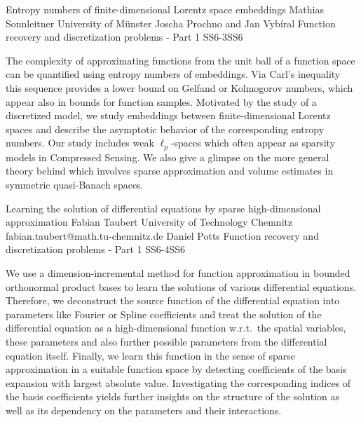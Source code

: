 \begin{talk}
  {Entropy numbers of finite-dimensional Lorentz space embeddings}%
  {Mathias Sonnleitner}%
  {University of M\"unster}%
  {}%
  {Joscha Prochno and Jan Vyb\'iral}%
{Function recovery and discretization problems - Part 1}
{}{SS6-3}{SS6}

The complexity of approximating functions from the unit ball of a function space can be quantified using entropy numbers of embeddings. Via Carl's inequality this sequence provides a lower bound on Gelfand or Kolmogorov numbers, which appear also in bounds for function samples. Motivated by the study of a discretized model, we study embeddings between finite-dimensional Lorentz spaces and describe the asymptotic behavior of the corresponding entropy numbers. Our study includes weak $\ell_p$-spaces which often appear as sparsity models in Compressed Sensing. We also give a glimpse on the more general theory behind which involves sparse approximation and volume estimates in symmetric quasi-Banach spaces.
\end{talk}

\begin{talk}
  {Learning the solution of differential equations by sparse high-dimensional approximation}%
  {Fabian Taubert}%
  {University of Technology Chemnitz}%
  {fabian.taubert@math.tu-chemnitz.de}%
  {Daniel Potts}%
{Function recovery and discretization problems - Part 1}
{}{SS6-4}{SS6}


We use a dimension-incremental method for function approximation in bounded orthonormal product bases to learn the solutions of various differential equations. Therefore, we deconstruct the source function of the differential equation into parameters like Fourier or Spline coefficients and treat the solution of the differential equation as a high-dimensional function w.r.t.\ the spatial variables, these parameters and also further possible parameters from the differential equation itself. Finally, we learn this function in the sense of sparse approximation in a suitable function space by detecting coefficients of the basis expansion with largest absolute value. Investigating the corresponding indices of the basis coefficients yields further insights on the structure of the solution as well as its dependency on the parameters and their interactions.
\end{talk}

